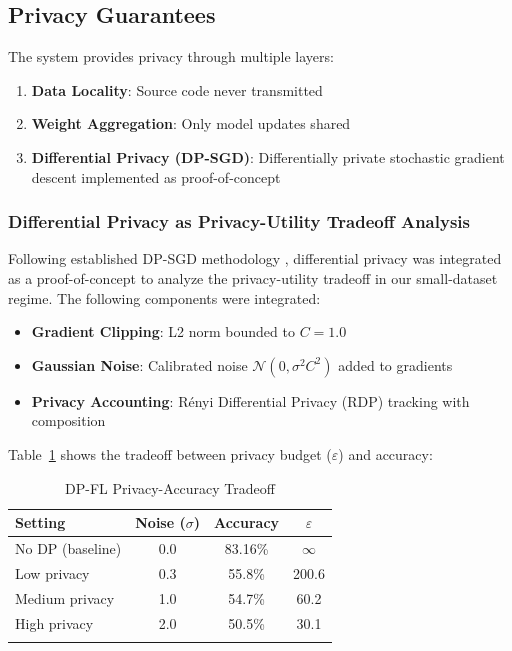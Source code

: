\documentclass[pdflatex,sn-mathphys-num]{sn-jnl}
\theoremstyle{thmstyleone}%
\theoremstyle{thmstyletwo}%
\theoremstyle{thmstylethree}%
\begin{document}
\subsection{Privacy Guarantees}\label{subsec:privacy}

The system provides privacy through multiple layers:

\begin{enumerate}
    \item \textbf{Data Locality}: Source code never transmitted
    \item \textbf{Weight Aggregation}: Only model updates shared
    \item \textbf{Differential Privacy (DP-SGD)}: Differentially private stochastic gradient descent implemented as proof-of-concept
\end{enumerate}

\subsubsection{Differential Privacy as Privacy-Utility Tradeoff Analysis}\label{subsubsec:dp}

Following established DP-SGD methodology \cite{abadi2024dpsgd, mcmahan2017learning}, differential privacy was integrated as a proof-of-concept to analyze the privacy-utility tradeoff in our small-dataset regime. The following components were integrated:

\begin{itemize}
    \item \textbf{Gradient Clipping}: L2 norm bounded to $C = 1.0$
    \item \textbf{Gaussian Noise}: Calibrated noise $\mathcal{N}(0, \sigma^2 C^2)$ added to gradients
    \item \textbf{Privacy Accounting}: R\'enyi Differential Privacy (RDP) tracking with composition
\end{itemize}

Table~\ref{tab:dp} shows the tradeoff between privacy budget ($\varepsilon$) and accuracy:

\begin{table}[h]
\caption{DP-FL Privacy-Accuracy Tradeoff}\label{tab:dp}
\begin{tabular}{lccc}
\toprule
\textbf{Setting} & \textbf{Noise ($\sigma$)} & \textbf{Accuracy} & \textbf{$\varepsilon$} \\
\midrule
No DP (baseline) & 0.0 & 83.16\% & $\infty$ \\
Low privacy & 0.3 & 55.8\% & 200.6 \\
Medium privacy & 1.0 & 54.7\% & 60.2 \\
High privacy & 2.0 & 50.5\% & 30.1 \\
\botrule
\end{tabular}
\end{table}
\end{document}
